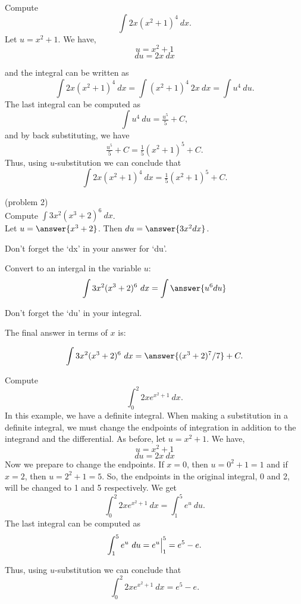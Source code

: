 \documentclass[handout]{ximera}
\begin{document}
\begin{example}[example 2] Compute 
\[\int 2x(x^2 + 1)^4 \ dx.\]
Let $u = x^2 + 1$.  We have,
\[u = x^2 + 1\]
\[du = 2x \ dx\]

and the integral can be written as 
\[\int 2x(x^2 + 1)^4 \ dx = \int (x^2 + 1)^4 \ 2x \  dx = \int u^4 \ du.\]
The last integral can be computed as 
\[\int u^4 \ du = \tfrac{u^5}{5} + C,\]
and by back substituting, we have 
\[\tfrac{u^5}{5} + C = \tfrac15(x^2 + 1)^5 + C .\]
Thus, using $u$-substitution we can conclude that
\[\int 2x(x^2 + 1)^4 \ dx  =  \tfrac15(x^2 + 1)^5 + C.\]
\end{example}

\begin{problem}(problem 2)\\
Compute $\displaystyle{\int 3x^2(x^3 + 2)^6 \ dx}$.\\
Let $u = \answer{x^3 + 2}$. Then $du = \answer{3x^2 dx}$.\\
\begin{hint}
Don't forget the `dx' in your answer for `du'.
\end{hint}
Convert to an intergal in the variable $u$:
\[\int 3x^2(x^3 + 2)^6 \ dx = \int\answer{u^6 du}\]
\begin{hint}
Don't forget the `du' in your integral.
\end{hint}
The final answer in terms of $x$ is:

\[\int 3x^2(x^3 + 2)^6 \ dx = \answer{(x^3 + 2)^7/7} +C.\]
\end{problem}



\begin{example}[example 3] Compute 
\[\int_0^2 2xe^{x^2 + 1} \ dx.\]
In this example, we have a definite integral.  When making a substitution in a definite integral, 
we must change the endpoints of integration in addition to the integrand and the differential.
As before, let $u = x^2 + 1$.  We have,
\[u = x^2 + 1\]
\[du = 2x \ dx\]
Now we prepare to change the endpoints. If $x = 0$, then $ u = 0^2 + 1 = 1$ and if $x = 2$, then $u = 2^2 +1 = 5$.
So, the endpoints in the original integral, 0 and 2, will be changed to 1 and 5 respectively. We get
\[\int_0^2 2xe^{x^2 + 1} \ dx  = \int_1^5  e^u \ du.\]
The last integral can be computed as 
\[\int_1^5 e^u \ du = e^u \Big{|}_1^5 = e^5 - e.\]

Thus, using $u$-substitution we can conclude that
\[\int_0^2 2xe^{x^2 + 1} \ dx =  e^5 - e.\]
\end{example}
\end{document}
